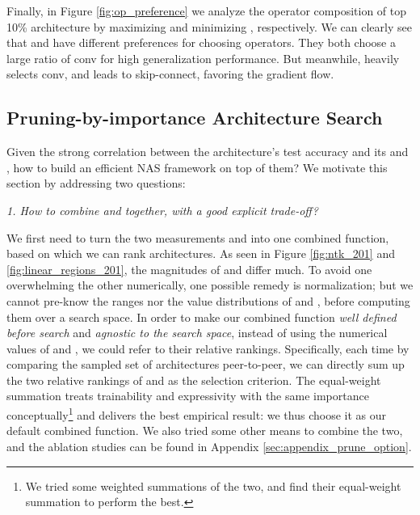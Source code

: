 \documentclass{article} \usepackage{iclr2021_conference,times}
\begin{document}
Finally, in Figure \ref{fig:op_preference} we analyze the operator composition of top 10\% architecture by maximizing  and minimizing , respectively. We can clearly see that  and  have different preferences for choosing operators. They both choose a large ratio of conv for high generalization performance. But meanwhile,  heavily selects conv, and  leads to skip-connect, favoring the gradient flow.

\vspace{-0.5em}

\subsection{Pruning-by-importance Architecture Search}\label{sec:pruning_search}

\vspace{-0.5em}

Given the strong correlation between the architecture's test accuracy and its  and , how to build an efficient NAS framework on top of them? We motivate this section by addressing two questions:

\vspace{-0.5em}
\textit{1. How to combine  and  together, with a good explicit trade-off?}

We first need to turn the two measurements  and  into one combined function, based on which we can rank architectures. As seen in Figure \ref{fig:ntk_201} and \ref{fig:linear_regions_201}, the magnitudes of  and  differ much. To avoid one overwhelming the other numerically, one possible remedy is normalization; but we cannot pre-know the ranges nor the value distributions of  and , before computing them over a search space. In order to make our combined function \textit{well defined before search} and \textit{agnostic to the search space}, instead of using the numerical values of  and , we could refer to their relative rankings. Specifically, each time by comparing the sampled set of architectures peer-to-peer, we can directly sum up the two relative rankings of  and  as the selection criterion. The equal-weight summation treats trainability and expressivity with the same importance conceptually\footnote{We tried some weighted summations of the two, and find their equal-weight summation to perform the best.} and delivers the best empirical result: we thus choose it as our default combined function. We also tried some other means to combine the two, and the ablation studies can be found in Appendix \ref{sec:appendix_prune_option}.
\end{document}
